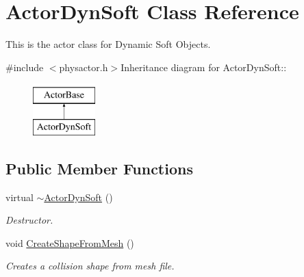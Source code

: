 \hypertarget{classActorDynSoft}{
\section{ActorDynSoft Class Reference}
\label{dc/de0/classActorDynSoft}
}


This is the actor class for Dynamic Soft Objects.  


{\ttfamily \#include $<$physactor.h$>$}Inheritance diagram for ActorDynSoft::\begin{figure}[H]
\begin{center}
\leavevmode
\includegraphics[height=2cm]{dc/de0/classActorDynSoft}
\end{center}
\end{figure}
\subsection*{Public Member Functions}
\begin{DoxyCompactItemize}
\item 
virtual \hyperlink{classActorDynSoft_a8d2941aee946c14ce616d4d856ddf758}{$\sim$ActorDynSoft} ()
\begin{DoxyCompactList}\small\item\em Destructor. \item\end{DoxyCompactList}\item 
void \hyperlink{classActorDynSoft_a979620b4ac447eb9875fb769d61a8092}{CreateShapeFromMesh} ()
\begin{DoxyCompactList}\small\item\em Creates a collision shape from mesh file. \item\end{DoxyCompactList}\end{DoxyCompactItemize}
